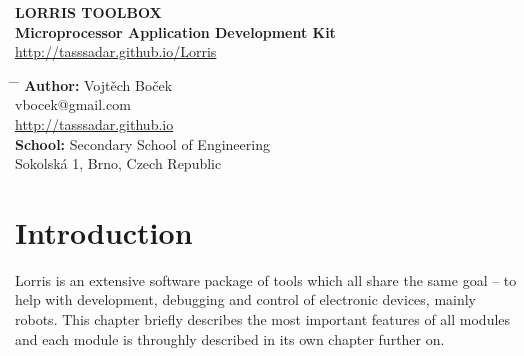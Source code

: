 \documentclass[12pt, a4paper, oneside]{article}
\newcommand{\B}{\textbf} %
\begin{document}
\setlength{\voffset}{-20mm}
\begin{center}

\Large
\B{LORRIS TOOLBOX} \\
\large
\B{Microprocessor Application Development Kit}
\url{http://tasssadar.github.io/Lorris}

\end{center}

\noindent
\begin{tabbing}
\hspace{0mm} \= \hspace{20mm}  \=   \kill %
  \> \B{Author:}  \> Vojtěch Boček        \\
  \>              \> vbocek@gmail.com      \\
  \>              \> \url{http://tasssadar.github.io} \\
  \> \B{School:}  \> Secondary School of Engineering     \\
  \>              \> Sokolská 1, Brno, Czech Republic    \\
\end{tabbing}

\section*{Introduction}
Lorris is an extensive software package of tools which all share the same goal -- to help with development, debugging and control of electronic devices, mainly robots. This chapter briefly describes the most important features of all modules and each module is throughly described in its own chapter further on.
\end{document}
